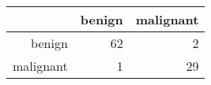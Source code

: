 \begin{tabular}{rrr}
  \hline
 & benign & malignant \\ 
  \hline
benign &  62 &   2 \\ 
  malignant &   1 &  29 \\ 
   \hline
\end{tabular}
